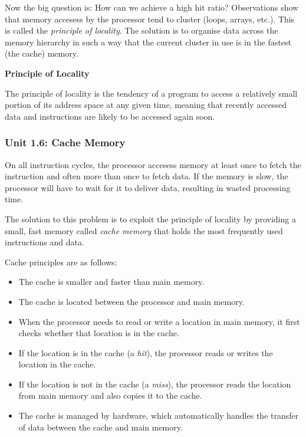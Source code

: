 \documentclass{article}
\begin{document}
Now the big question is: How can we achieve a high hit ratio?
Observations show that memory accesess by the processor tend to cluster (loops, arrays, etc.). This is called the \textit{principle of locality}.
The solution is to organise data across the memory hierarchy in such a way that the current cluster in use is in the fastest (the cache) memory.

\begin{definitionbox}
    \textbf{Principle of Locality}

    The principle of locality is the tendency of a program to access a relatively small portion of its address space at any given time, 
    meaning that recently accessed data and instructions are likely to be accessed again soon.
\end{definitionbox}



\subsubsection*{Unit 1.6: Cache Memory}
{}

On all instruction cycles, the processor accesess memory at least once to fetch the instruction and 
often more than once to fetch data. If the memory is slow, the processor will have to wait for it to deliver data, 
resulting in wasted processing time.

The solution to this problem is to exploit the principle of locality by providing a small, fast memory called \textit{cache memory} that holds the most frequently 
used instructions and data.

Cache principles are as follows:
\begin{itemize}
    \item The cache is smaller and faster than main memory.
    \item The cache is located between the processor and main memory.
    \item When the processor needs to read or write a location in main memory, it first checks whether that location is in the cache.
    \item If the location is in the cache (a \textit{hit}), the processor reads or writes the location in the cache.
    \item If the location is not in the cache (a \textit{miss}), the processor reads the location from main memory and also copies it to the cache.
    \item The cache is managed by hardware, which automatically handles the transfer of data between the cache and main memory.
\end{itemize}
\end{document}
